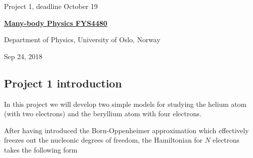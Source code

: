 \documentclass[%
oneside,                 %
final,                   %
10pt]{article}
\begin{document}

\newcommand{\exercisesection}[1]{\subsection*{#1}}







\thispagestyle{empty}

\begin{center}
{\LARGE\bf
\begin{spacing}{1.25}
Project 1, deadline  October 19
\end{spacing}
}
\end{center}


\begin{center}
{\bf \href{{http://www.uio.no/studier/emner/matnat/fys/FYS4480/index-eng.html}}{Many-body Physics FYS4480}}
\end{center}

    \begin{center}
\centerline{{\small Department of Physics, University of Oslo, Norway}}
\end{center}
    

\begin{center}
Sep 24, 2018
\end{center}

\vspace{1cm}


\subsection{Project 1 introduction}

In this project we will develop two simple models for studying the 
helium atom (with two electrons) and the beryllium atom with four electrons.

After having introduced the  Born-Oppenheimer approximation which effectively freezes out the nucleonic degrees
of freedom, the Hamiltonian for $N$ electrons takes the following form
\end{document}
